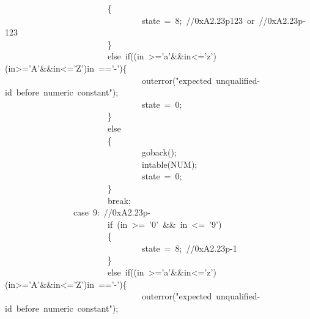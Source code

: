 \documentclass{article}
\begin{document}
\begin{mdpre}
~~~~~~~~~~~~~~~~~~~~~~~~\{\\
~~~~~~~~~~~~~~~~~~~~~~~~~~~~~~~~state~=~{8};~{//0xA2.23p123~or~//0xA2.23p-123}\\
~~~~~~~~~~~~~~~~~~~~~~~~\}\\
~~~~~~~~~~~~~~~~~~~~~~~~{else}~{if}((in~\textgreater{}={'a'}\&\&in\textless{}={'z'})\textbar{}\textbar{}(in\textgreater{}={'A'}\&\&in\textless{}={'Z'})\textbar{}\textbar{}in~=={'-'})\{\\
~~~~~~~~~~~~~~~~~~~~~~~~~~~~~~~~outerror({"}{expected~unqualified-id~before~numeric~constant}{"});\\
~~~~~~~~~~~~~~~~~~~~~~~~~~~~~~~~state~=~{0};\\
~~~~~~~~~~~~~~~~~~~~~~~~\}\\
~~~~~~~~~~~~~~~~~~~~~~~~{else}\\
~~~~~~~~~~~~~~~~~~~~~~~~\{\\
~~~~~~~~~~~~~~~~~~~~~~~~~~~~~~~~goback();\\
~~~~~~~~~~~~~~~~~~~~~~~~~~~~~~~~intable({NUM});\\
~~~~~~~~~~~~~~~~~~~~~~~~~~~~~~~~state~=~{0};\\
~~~~~~~~~~~~~~~~~~~~~~~~\}\\
~~~~~~~~~~~~~~~~~~~~~~~~{break};\\
~~~~~~~~~~~~~~~~{case}~{9}:~{//0xA2.23p-}\\
~~~~~~~~~~~~~~~~~~~~~~~~{if}~(in~\textgreater{}=~{'0'}~\&\&~in~\textless{}=~{'9'})\\
~~~~~~~~~~~~~~~~~~~~~~~~\{\\
~~~~~~~~~~~~~~~~~~~~~~~~~~~~~~~~state~=~{8};~{//0xA2.23p-1}\\
~~~~~~~~~~~~~~~~~~~~~~~~\}\\
~~~~~~~~~~~~~~~~~~~~~~~~{else}~{if}((in~\textgreater{}={'a'}\&\&in\textless{}={'z'})\textbar{}\textbar{}(in\textgreater{}={'A'}\&\&in\textless{}={'Z'})\textbar{}\textbar{}in~=={'-'})\{\\
~~~~~~~~~~~~~~~~~~~~~~~~~~~~~~~~outerror({"}{expected~unqualified-id~before~numeric~constant}{"});\\

\end{mdpre}
\end{document}
